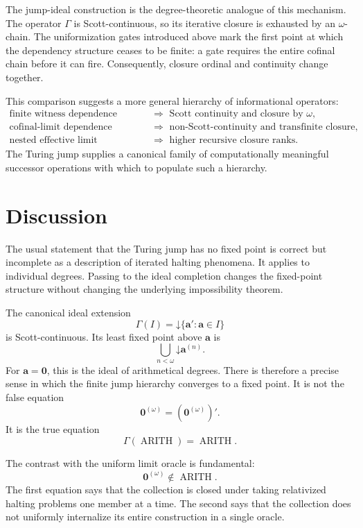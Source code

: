 \documentclass[11pt]{article}
\theoremstyle{definition}
\theoremstyle{remark}
\newcommand{\Arith}{\operatorname{ARITH}}
\newcommand{\down}{\mathord{\downarrow}}
\begin{document}
The jump-ideal construction is the degree-theoretic analogue of this mechanism. The operator $\Gamma$ is Scott-continuous, so its iterative closure is exhausted by an $\omega$-chain. The uniformization gates introduced above mark the first point at which the dependency structure ceases to be finite: a gate requires the entire cofinal chain before it can fire. Consequently, closure ordinal and continuity change together.

This comparison suggests a more general hierarchy of informational operators:
\[
\begin{aligned}
\text{finite witness dependence} &\Longrightarrow \text{ Scott continuity and closure by }\omega,\\[3pt]
\text{cofinal-limit dependence} &\Longrightarrow \text{ non-Scott-continuity and transfinite closure},\\[3pt]
\text{nested effective limit dependence} &\Longrightarrow \text{ higher recursive closure ranks}.
\end{aligned}
\]
The Turing jump supplies a canonical family of computationally meaningful successor operations with which to populate such a hierarchy.

\section{Discussion}

The usual statement that the Turing jump has no fixed point is correct but incomplete as a description of iterated halting phenomena. It applies to individual degrees. Passing to the ideal completion changes the fixed-point structure without changing the underlying impossibility theorem.

The canonical ideal extension
\[
\Gamma(I)=\down\{\mathbf a':\mathbf a\in I\}
\]
is Scott-continuous. Its least fixed point above $\mathbf a$ is
\[
\bigcup_{n<\omega}\down\mathbf a^{(n)}.
\]
For $\mathbf a=\mathbf0$, this is the ideal of arithmetical degrees. There is therefore a precise sense in which the finite jump hierarchy converges to a fixed point. It is not the false equation
\[
\mathbf0^{(\omega)}=(\mathbf0^{(\omega)})'.
\]
It is the true equation
\[
\Gamma(\Arith)=\Arith.
\]

The contrast with the uniform limit oracle is fundamental:
\[
\mathbf0^{(\omega)}\notin\Arith.
\]
The first equation says that the collection is closed under taking relativized halting problems one member at a time. The second says that the collection does not uniformly internalize its entire construction in a single oracle.
\end{document}
